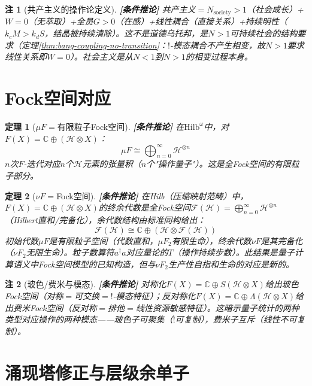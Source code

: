 \documentclass[11pt,a4paper]{article}
\newtheorem{theorem}{定理}
\newtheorem{remark}{注}
\newcommand{\lvl}[1]{\hfill\textbf{\footnotesize[#1]}}
\newcommand{\lvC}{\lvl{条件推论}}
\newcommand{\bang}{{!}}
\begin{document}
\begin{remark}[共产主义的操作论定义]\lvC
共产主义$=$$N_{\mathrm{society}}>1$（社会成长）+$W=0$（无萃取）+全员$G>0$（在感）+线性耦合（直接关系）+持续明性（$k_c M>k_d S$，结晶被持续清除）。这不是道德乌托邦，是$N>1$可持续社会的结构要求（定理\ref{thm:bang-coupling-no-transition}：$\bang$-模态耦合不产生相变，故$N>1$要求线性关系即$W=0$）。社会主义是从$N<1$到$N>1$的相变过程本身。
\end{remark}


\section{Fock空间对应}

\begin{theorem}[$\mu F=$有限粒子Fock空间]\label{thm:mu-fock}\lvC
在$\mathrm{Hilb}^\omega$中，对$F(X)=\mathbb{C}\oplus(\mathcal{H}\otimes X)$：
$$\mu F \cong \bigoplus_{n=0}^{\infty}\mathcal{H}^{\otimes n}$$
$n$次$F$-迭代对应$n$个$\mathcal{H}$元素的张量积（$n$个"操作量子"）。这是全Fock空间的有限粒子部分。
\end{theorem}

\begin{theorem}[$\nu F=$Fock空间]\label{thm:nu-fock}\lvC
在Hilb（压缩映射范畴）中，$F(X)=\mathbb{C}\oplus(\mathcal{H}\otimes X)$的终余代数是全Fock空间$\mathcal{F}(\mathcal{H})=\bigoplus_{n=0}^{\infty}\mathcal{H}^{\otimes n}$（Hilbert直和/完备化），余代数结构由标准同构给出：
$$\mathcal{F}(\mathcal{H})\cong\mathbb{C}\oplus(\mathcal{H}\otimes\mathcal{F}(\mathcal{H}))$$
初始代数$\mu F$是有限粒子空间（代数直和，$\mu F_2$有限生命），终余代数$\nu F$是其完备化（$\nu F_2$无限生命）。粒子数算符$a^\dagger a$对应量论的$T$（操作持续步数）。此结果是量子计算语义中Fock空间模型的已知构造，但与$\nu F_2$生产性自指和生命的对应是新的。
\end{theorem}

\begin{remark}[玻色/费米与模态]\lvC
对称化$F(X)=\mathbb{C}\oplus S(\mathcal{H}\otimes X)$给出玻色Fock空间（对称$=$可交换$=$$\bang$-模态特征）；反对称化$F(X)=\mathbb{C}\oplus\Lambda(\mathcal{H}\otimes X)$给出费米Fock空间（反对称$=$排他$=$线性资源敏感特征）。这暗示量子统计的两种类型对应操作的两种模态——玻色子可聚集（$\bang$可复制），费米子互斥（线性不可复制）。
\end{remark}


\section{涌现塔修正与层级余单子}
\end{document}
